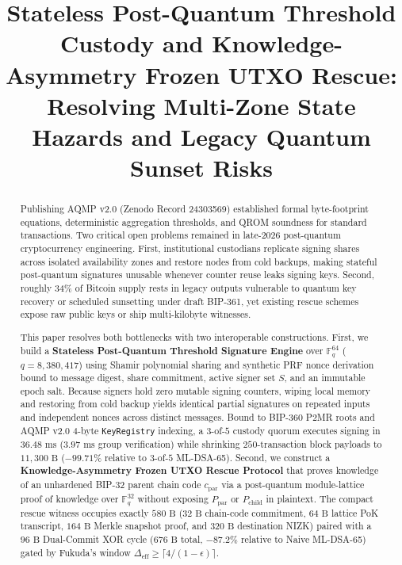 \documentclass[conference,compsoc]{IEEEtran}
\title{Stateless Post-Quantum Threshold Custody and Knowledge-Asymmetry Frozen UTXO Rescue:\\
Resolving Multi-Zone State Hazards and Legacy Quantum Sunset Risks}
\author{
  \IEEEauthorblockN{Laudza Kusuma}
  \IEEEauthorblockA{Independent Researcher, Depok, Indonesia\\
  Email: laudzaxie@gmail.com\\
  Web: \url{https://laudzakusuma.github.io}}
}
\begin{document}
\sloppy
\maketitle

\begin{abstract}
Publishing AQMP v2.0 (Zenodo Record 24303569) established formal byte-footprint equations, deterministic aggregation thresholds, and QROM soundness for standard transactions. Two critical open problems remained in late-2026 post-quantum cryptocurrency engineering. First, institutional custodians replicate signing shares across isolated availability zones and restore nodes from cold backups, making stateful post-quantum signatures unusable whenever counter reuse leaks signing keys. Second, roughly 34\% of Bitcoin supply rests in legacy outputs vulnerable to quantum key recovery or scheduled sunsetting under draft BIP-361, yet existing rescue schemes expose raw public keys or ship multi-kilobyte witnesses.

This paper resolves both bottlenecks with two interoperable constructions. First, we build a \textbf{Stateless Post-Quantum Threshold Signature Engine} over $\mathbb{F}_q^{64}$ ($q = 8{,}380{,}417$) using Shamir polynomial sharing and synthetic PRF nonce derivation bound to message digest, share commitment, active signer set $S$, and an immutable epoch salt. Because signers hold zero mutable signing counters, wiping local memory and restoring from cold backup yields identical partial signatures on repeated inputs and independent nonces across distinct messages. Bound to BIP-360 P2MR roots and AQMP v2.0 4-byte \texttt{KeyRegistry} indexing, a $3$-of-$5$ custody quorum executes signing in $36.48\text{ ms}$ ($3.97\text{ ms}$ group verification) while shrinking $250$-transaction block payloads to $11{,}300\text{ B}$ ($-99.71\%$ relative to $3$-of-$5$ ML-DSA-65). Second, we construct a \textbf{Knowledge-Asymmetry Frozen UTXO Rescue Protocol} that proves knowledge of an unhardened BIP-32 parent chain code $c_{\text{par}}$ via a post-quantum module-lattice proof of knowledge over $\mathbb{F}_q^{32}$ without exposing $P_{\text{par}}$ or $P_{\text{child}}$ in plaintext. The compact rescue witness occupies exactly $580\text{ B}$ ($32\text{ B}$ chain-code commitment, $64\text{ B}$ lattice PoK transcript, $164\text{ B}$ Merkle snapshot proof, and $320\text{ B}$ destination NIZK) paired with a $96\text{ B}$ Dual-Commit XOR cycle ($676\text{ B}$ total, $-87.2\%$ relative to Naive ML-DSA-65) gated by Fukuda's window $\Delta_{\text{eff}} \ge \lceil 4/(1-\epsilon)\rceil$.
\end{abstract}
\end{document}
